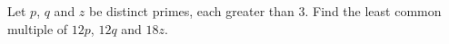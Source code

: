 Let $p$, $q$ and $z$ be distinct primes, each greater than $3$. Find the least common multiple of $12p$, $12q$ and $18z$.
